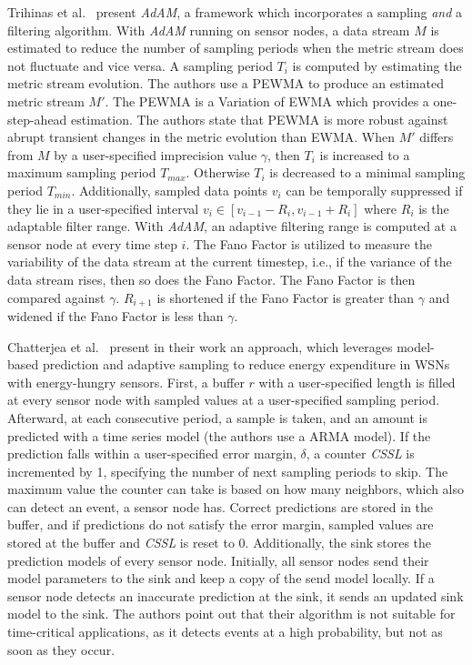 Trihinas et al.~\cite{trihinas2015adam} present \textit{AdAM}, a framework
which incorporates a sampling \textit{and} a filtering algorithm. With
\textit{AdAM} running on sensor nodes, a data stream $ M $ is estimated to
reduce the number of sampling periods when the metric stream does not fluctuate
and vice versa. A sampling period $ T_i $ is computed by estimating the metric
stream evolution. The authors use a \ac{PEWMA} to produce an estimated metric
stream $ M' $. The \ac{PEWMA} is a Variation of \ac{EWMA} which provides a
one-step-ahead estimation. The authors state that \ac{PEWMA} is more robust
against abrupt transient changes in the metric evolution than \ac{EWMA}. When $
M' $ differs from $ M $ by a user-specified imprecision value $
\gamma $, then $ T_i $ is increased to a maximum sampling period $ T_{max}
$. Otherwise $ T_i $ is decreased to a minimal sampling period $ T_{min} $.
Additionally, sampled data points $ v_{i} $ can be temporally suppressed if
they lie in a user-specified interval $ v_i \in [v_{i-1} - R_i, v_{i-1} + R_i]
$ where $ R_i $ is the adaptable filter range. With \textit{AdAM}, an adaptive
filtering range is computed at a sensor node at every time step $ i $. The Fano
Factor is utilized to measure the variability of the data stream at the current
timestep, i.e., if the variance of the data stream rises, then so does the Fano
Factor. The Fano Factor is then compared against $ \gamma $. $ R_{i+1} $ is
shortened if the Fano Factor is greater than $ \gamma $ and widened if the Fano
Factor is less than $ \gamma $.

Chatterjea et al.~\cite{chatterjea2008adaptive} present in their work an
approach, which leverages model-based prediction and adaptive sampling to
reduce energy expenditure in \acp{WSN} with energy-hungry sensors. First, a
buffer $ r $ with a user-specified length is filled at every sensor node with
sampled values at a user-specified sampling period. Afterward, at each
consecutive period, a sample is taken, and an amount is predicted with a time
series model (the authors use a \ac{ARMA} model). If the prediction falls
within a user-specified error margin, $ \delta $, a counter \textit{CSSL} is
incremented by 1, specifying the number of next sampling periods to skip. The
maximum value the counter can take is based on how many neighbors, which also
can detect an event, a sensor node has. Correct predictions are stored in the
buffer, and if predictions do not satisfy the error margin, sampled values are
stored at the buffer and \textit{CSSL} is reset to 0. Additionally, the sink
stores the prediction models of every sensor node. Initially, all sensor nodes
send their model parameters to the sink and keep a copy of the send model
locally. If a sensor node detects an inaccurate prediction at the sink, it
sends an updated sink model to the sink. The authors point out that their
algorithm is not suitable for time-critical applications, as it detects events
at a high probability, but not as soon as they occur.

